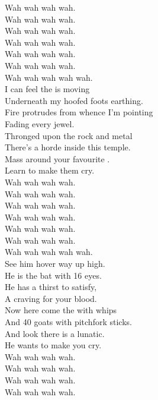 
Wah wah wah wah. \\
Wah wah wah wah. \\
Wah wah wah wah. \\
Wah wah wah wah. \\

Wah wah wah wah. \\
Wah wah wah wah. \\
Wah wah wah wah wah. \\

I can feel the  is moving \\
Underneath my hoofed foots earthing. \\
Fire protrudes from whence I'm pointing \\
Fading every jewel. \\

Thronged upon the rock and metal \\
There's a horde inside this temple. \\
Mass around your favourite . \\
Learn to make them cry. \\

Wah wah wah wah. \\
Wah wah wah wah. \\
Wah wah wah wah. \\
Wah wah wah wah. \\

Wah wah wah wah. \\
Wah wah wah wah. \\
Wah wah wah wah wah. \\

See him hover way up high. \\
He is the bat with 16 eyes. \\
He has a thirst to satisfy, \\
A craving for your blood. \\

Now here come the  with whips \\
And 40 goats with pitchfork sticks. \\
And look there is a lunatic. \\
He wants to make you cry. \\

Wah wah wah wah. \\
Wah wah wah wah. \\
Wah wah wah wah. \\
Wah wah wah wah. \\

